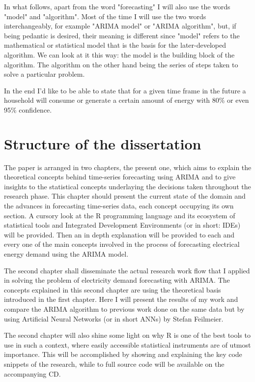 \documentclass[12pt,a4paper,titlepage]{report}
\begin{document}
In what follows, apart from the word "forecasting" I will also use the words "model" and "algorithm". Most of the time I will use the two words interchangeably, for example "ARIMA model" or "ARIMA algorithm", but, if being pedantic is desired, their meaning is different since "model" refers to the mathematical or statistical model that is the basis for the later-developed algorithm. We can look at it this way: the model is the building block of the algorithm. The algorithm on the other hand being the series of steps taken to solve a particular problem.

In the end I'd like to be able to state that for a given time frame in the future a household will consume or generate a certain amount of energy with 80\% or even 95\% confidence.

\section{Structure of the dissertation}

The paper is arranged in two chapters, the present one, which aims to explain the theoretical concepts behind time-series forecasting using ARIMA and to give insights to the statistical concepts underlaying the decisions taken throughout the research phase.
This chapter should present the current state of the domain and the advances in forecasting time-series data, each concept occupying its own section. A cursory look at the R programming language and its ecosystem of statistical tools and Integrated Development Environments (or in short: IDEs) will be provided. Then an in depth explanation will be provided to each and every one of the main concepts involved in the process of forecasting electrical energy demand using the ARIMA model.

The second chapter shall disseminate the actual research work flow that I applied in solving the problem of electricity demand forecasting with ARIMA. The concepts explained in this second chapter are using the theoretical basis introduced in the first chapter.
Here I will present the results of my work and compare the ARIMA algorithm to previous work done on the same data but by using Artificial Neural Networks (or in short ANNs) by Stefan Feilmeier.

The second chapter will also shine some light on why R is one of the best tools to use in such a context, where easily accessible statistical instruments are of utmost importance. This will be accomplished by showing and explaining the key code snippets of the research, while to full source code will be available on the accompanying CD.
\end{document}
